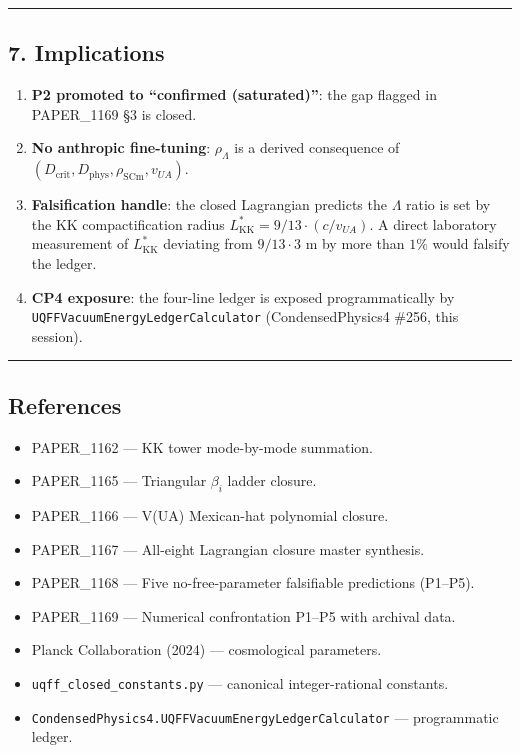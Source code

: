 \documentclass[
]{article}
\providecommand{\tightlist}{%
  \setlength{\itemsep}{0pt}\setlength{\parskip}{0pt}}
\begin{document}
\begin{center}\rule{0.5\linewidth}{0.5pt}\end{center}

\subsection{7. Implications}\label{implications}

\begin{enumerate}
\def\labelenumi{\arabic{enumi}.}
\tightlist
\item
  \textbf{P2 promoted to ``confirmed (saturated)''}: the gap flagged in
  PAPER\_1169 §3 is closed.
\item
  \textbf{No anthropic fine-tuning}: \(\rho_{\Lambda}\) is a derived
  consequence of
  \((D_{\mathrm{crit}}, D_{\mathrm{phys}}, \rho_{\mathrm{SCm}}, v_{UA})\).
\item
  \textbf{Falsification handle}: the closed Lagrangian predicts the
  \(\Lambda\) ratio is set by the KK compactification radius
  \(L_{\mathrm{KK}}^{*} = 9/13\cdot(c/v_{UA})\). A direct laboratory
  measurement of \(L_{\mathrm{KK}}^{*}\) deviating from \(9/13\cdot 3\)
  m by more than \(1\%\) would falsify the ledger.
\item
  \textbf{CP4 exposure}: the four-line ledger is exposed
  programmatically by \texttt{UQFFVacuumEnergyLedgerCalculator}
  (CondensedPhysics4 \#256, this session).
\end{enumerate}

\begin{center}\rule{0.5\linewidth}{0.5pt}\end{center}

\subsection{References}\label{references}

\begin{itemize}
\tightlist
\item
  PAPER\_1162 --- KK tower mode-by-mode summation.
\item
  PAPER\_1165 --- Triangular \(\beta_{i}\) ladder closure.
\item
  PAPER\_1166 --- V(UA) Mexican-hat polynomial closure.
\item
  PAPER\_1167 --- All-eight Lagrangian closure master synthesis.
\item
  PAPER\_1168 --- Five no-free-parameter falsifiable predictions
  (P1--P5).
\item
  PAPER\_1169 --- Numerical confrontation P1--P5 with archival data.
\item
  Planck Collaboration (2024) --- cosmological parameters.
\item
  \texttt{uqff\_closed\_constants.py} --- canonical integer-rational
  constants.
\item
  \texttt{CondensedPhysics4.UQFFVacuumEnergyLedgerCalculator} ---
  programmatic ledger.
\end{itemize}
\end{document}

